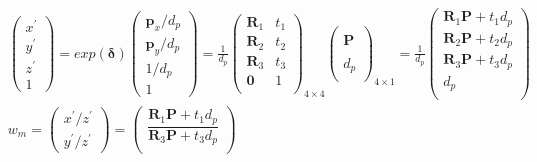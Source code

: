 \documentclass{article}
\begin{document}
\begin{CJK*}{GBK}{song}
\begin{equation}\left.
\begin{aligned}\\&
\begin{pmatrix}x^{'}\\y^{'}\\z^{'}\\1\end{pmatrix}=
exp(\boldsymbol{\delta})\begin{pmatrix}\boldsymbol{p}_x/d_p\\\boldsymbol{p}_y/d_p\\1/d_p\\1\end{pmatrix}
=\frac{1}{d_p}\left(
                \begin{array}{cc}
                  \boldsymbol{R}_1 & t_1 \\
                  \boldsymbol{R}_2 & t_2 \\
                  \boldsymbol{R}_3 & t_3 \\
                  \boldsymbol{0}   & 1 \\
                \end{array}
              \right)_{4\times{4}}
              \left(
                \begin{array}{c}
                    \\
                  \boldsymbol{P} \\
                   \\
                  {d_p} \\
                \end{array}
              \right)_{4\times{1}}
=\frac{1}{d_p}\left(
                \begin{array}{c}
                  \boldsymbol{R}_1\boldsymbol{P}+t_1d_p \\
                  \boldsymbol{R}_2\boldsymbol{P}+t_2d_p \\
                  \boldsymbol{R}_3\boldsymbol{P}+t_3d_p \\
                  d_p \\
                \end{array}
              \right)
\\&
w_m=\begin{pmatrix}{x^{'}}/{z^{'}}\\{y^{'}}/{z^{'}}\end{pmatrix}
=\begin{pmatrix}\dfrac{\boldsymbol{R}_1\boldsymbol{P}+t_1d_p}{\boldsymbol{R}_3\boldsymbol{P}+t_3d_p}\\

\end{pmatrix}
\end{aligned}
\end{equation}
\end{CJK*}
\end{document}
